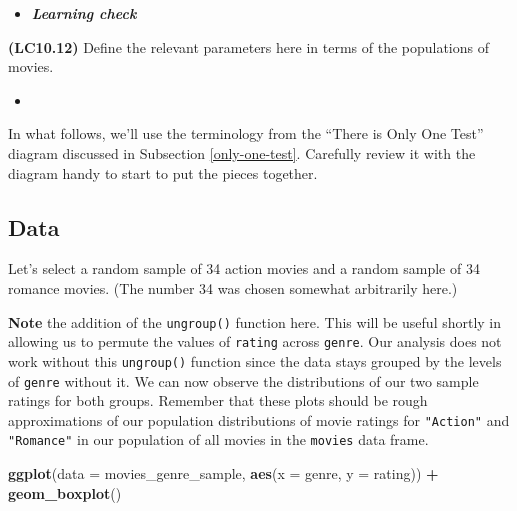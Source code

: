 \documentclass[12pt, krantz2,]{krantz}
\makeatletter
\newenvironment{Shaded}{\begin{snugshade}}{\end{snugshade}}
\newcommand{\DataTypeTok}[1]{\textcolor[rgb]{0.27,0.27,0.27}{#1}}
\newcommand{\DecValTok}[1]{\textcolor[rgb]{0.06,0.06,0.06}{#1}}
\newcommand{\KeywordTok}[1]{\textcolor[rgb]{0.27,0.27,0.27}{\textbf{#1}}}
\newcommand{\NormalTok}[1]{#1}
\newcommand{\OperatorTok}[1]{\textcolor[rgb]{0.43,0.43,0.43}{\textbf{#1}}}
\newcommand{\StringTok}[1]{\textcolor[rgb]{0.5,0.5,0.5}{#1}}
\newenvironment{kframe}{%
\medskip{}
\setlength{\fboxsep}{.8em}
 \def\at@end@of@kframe{}%
 \ifinner\ifhmode%
  \def\at@end@of@kframe{\end{minipage}}%
  \begin{minipage}{\columnwidth}%
 \fi\fi%
 \def\FrameCommand##1{\hskip\@totalleftmargin \hskip-\fboxsep
 \colorbox{shadecolor}{##1}\hskip-\fboxsep
     \hskip-\linewidth \hskip-\@totalleftmargin \hskip\columnwidth}%
 \MakeFramed {\advance\hsize-\width
   \@totalleftmargin\z@ \linewidth\hsize
   \@setminipage}}%
 {\par\unskip\endMakeFramed%
 \at@end@of@kframe}
\renewenvironment{Shaded}{\begin{kframe}}{\end{kframe}}
\newenvironment{rmdblock}[1]
  {\begin{shaded*}
  \begin{itemize}
  \renewcommand{\labelitemi}{
    \raisebox{-.7\height}[0pt][0pt]{
    }
  }
  \item
  }
  {
  \end{itemize}
  \end{shaded*}
  }
\newenvironment{learncheck}
  {\begin{rmdblock}{warning}}
  {\end{rmdblock}}
\makeatother
\begin{document}
\begin{learncheck}
\textbf{\emph{Learning check}}
\end{learncheck}

\textbf{(LC10.12)} Define the relevant parameters here in terms of the populations of movies.

\begin{learncheck}

\end{learncheck}

In what follows, we'll use the terminology from the ``There is Only One Test'' diagram discussed in Subsection \ref{only-one-test}. Carefully review it with the diagram handy to start to put the pieces together.

\hypertarget{data}{%
\subsection{Data}\label{data}}

Let's select a random sample of 34 action movies and a random sample of 34 romance movies. (The number 34 was chosen somewhat arbitrarily here.)

\begin{Shaded}
\end{Shaded}

\textbf{Note} the addition of the \texttt{ungroup()} function here. This will be useful shortly in allowing us to permute the values of \texttt{rating} across \texttt{genre}. Our analysis does not work without this \texttt{ungroup()} function since the data stays grouped by the levels of \texttt{genre} without it. We can now observe the distributions of our two sample ratings for both groups. Remember that these plots should be rough approximations of our population distributions of movie ratings for \texttt{"Action"} and \texttt{"Romance"} in our population of all movies in the \texttt{movies} data frame.

\begin{Shaded}
\begin{Highlighting}[]
\KeywordTok{ggplot}\NormalTok{(}\DataTypeTok{data =}\NormalTok{ movies_genre_sample, }\KeywordTok{aes}\NormalTok{(}\DataTypeTok{x =}\NormalTok{ genre, }\DataTypeTok{y =}\NormalTok{ rating)) }\OperatorTok{+}
\StringTok{  }\KeywordTok{geom_boxplot}\NormalTok{()}
\end{Highlighting}
\end{Shaded}
\end{document}
